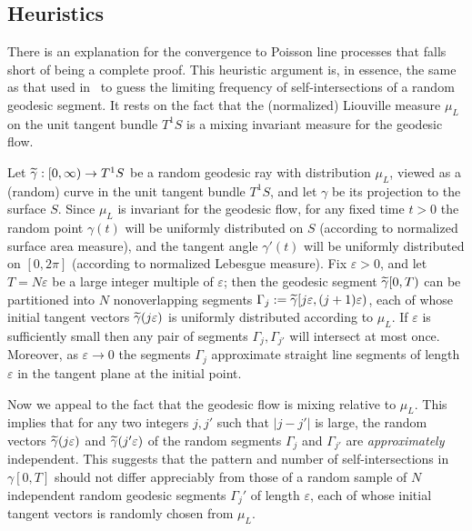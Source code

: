 \documentclass[AHL, Unicode, longabstracts, published]{cedram}
\let\oldtilde\tilde
\renewcommand*{\tilde}[1]{\mathchoice{\widetilde{#1}}{\widetilde{#1}}{\oldtilde{#1}}{\oldtilde{#1}}}\let\oldforall\forall
\renewcommand*{\forall}{\mathrel{\oldforall}}
\begin{document}
\subsection{Heuristics}\label{ssec:heuristics}
There is an explanation for the convergence to Poisson line processes that falls short of being a complete proof. This heuristic argument is, in essence, the same as that used in~\cite{lalley:si1} to guess the limiting frequency of self-intersections of a random geodesic segment. It rests on the fact that the (normalized) Liouville measure $\mu_{L}$ on the unit tangent bundle $T^{1}S$ is a mixing invariant measure for the geodesic flow.

Let $\tilde{\gamma} : [0,\infty) \rightarrow T^{1}S$ be a random geodesic ray with distribution $\mu_{L}$, viewed as a (random) curve in the unit tangent bundle $T^{1}S$, and let $\gamma$ be its projection to the surface $S$. Since $\mu_{L}$ is invariant for the geodesic flow, for any fixed time $t>0$ the random point $\gamma(t)$ will be uniformly distributed on $S$ (according to normalized surface area measure), and the tangent angle ${\gamma}'(t)$ will be uniformly distributed on $[0, 2\pi]$ (according to normalized Lebesgue measure). Fix $\varepsilon >0$, and let $T=N\varepsilon$ be a large integer multiple of $\varepsilon$; then the geodesic segment $\tilde{\gamma}[0,T)$ can be partitioned into $N$ nonoverlapping segments $\Gamma_{j}:=\tilde{\gamma}[j\varepsilon, (j+1)\varepsilon)$, each of whose initial tangent vectors $\tilde{\gamma}(j\varepsilon)$ is uniformly distributed according to $\mu_{L}$. If $\varepsilon$ is sufficiently small then any pair of segments $\Gamma_{j}, \Gamma_{j'}$ will intersect at most once. Moreover, as $\varepsilon \rightarrow 0$ the segments $\Gamma_{j}$ approximate straight line segments of length $\varepsilon $ in the tangent plane at the initial point.

Now we appeal to the fact that the geodesic flow is mixing relative to $\mu_{L}$. This implies that for any two integers $j,j'$ such that $|j-j'|$ is large, the random vectors $\tilde{\gamma}(j \varepsilon)$ and $\tilde{\gamma}(j' \varepsilon)$ of the random segments $\Gamma_{j}$ and $\Gamma_{j'}$ are \emph{approximately} independent. This suggests that the pattern and number of self-intersections in $\gamma[0,T]$ should not differ appreciably from those of a random sample of $N$ independent random geodesic segments $\Gamma_{j}'$ of length $\varepsilon$, each of whose initial tangent vectors is randomly chosen from $\mu_{L}$.
\end{document}
